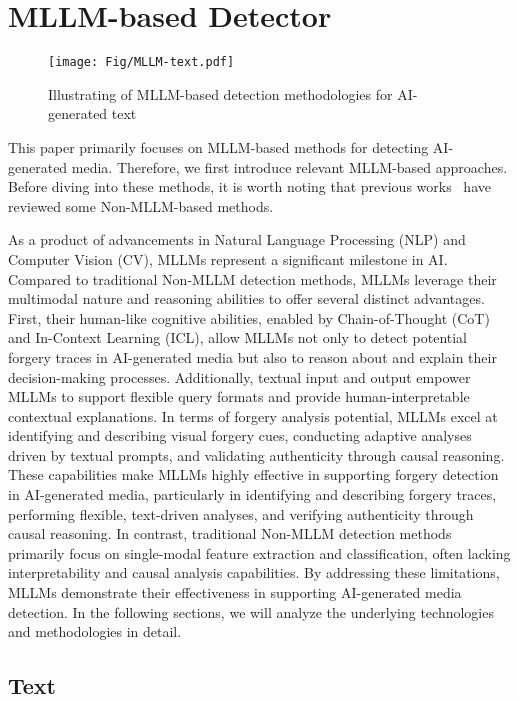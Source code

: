 \section{MLLM-based Detector}
\label{sec:mllm}
\begin{figure*}[!ht]
  \centering
    \texttt{[image: Fig/MLLM-text.pdf]}
    \caption{Illustrating of MLLM-based detection methodologies for AI-generated text}
    \label{fig:MLLM-text}
\end{figure*}
This paper primarily focuses on MLLM-based methods for detecting AI-generated media. Therefore, we first introduce relevant MLLM-based approaches. Before diving into these methods, it is worth noting that previous works~\cite{lin2024detecting, deng2024survey, yu2024fake} have reviewed some Non-MLLM-based methods.

As a product of advancements in Natural Language Processing (NLP) and Computer Vision (CV), MLLMs represent a significant milestone in AI. Compared to traditional Non-MLLM detection methods, MLLMs leverage their multimodal nature and reasoning abilities to offer several distinct advantages. First, their human-like cognitive abilities, enabled by Chain-of-Thought (CoT) and In-Context Learning (ICL), allow MLLMs not only to detect potential forgery traces in AI-generated media but also to reason about and explain their decision-making processes. Additionally, textual input and output empower MLLMs to support flexible query formats and provide human-interpretable contextual explanations. In terms of forgery analysis potential, MLLMs excel at identifying and describing visual forgery cues, conducting adaptive analyses driven by textual prompts, and validating authenticity through causal reasoning. These capabilities make MLLMs highly effective in supporting forgery detection in AI-generated media, particularly in identifying and describing forgery traces, performing flexible, text-driven analyses, and verifying authenticity through causal reasoning. In contrast, traditional Non-MLLM detection methods primarily focus on single-modal feature extraction and classification, often lacking interpretability and causal analysis capabilities. By addressing these limitations, MLLMs demonstrate their effectiveness in supporting AI-generated media detection. In the following sections, we will analyze the underlying technologies and methodologies in detail.
\subsection{Text}
%
